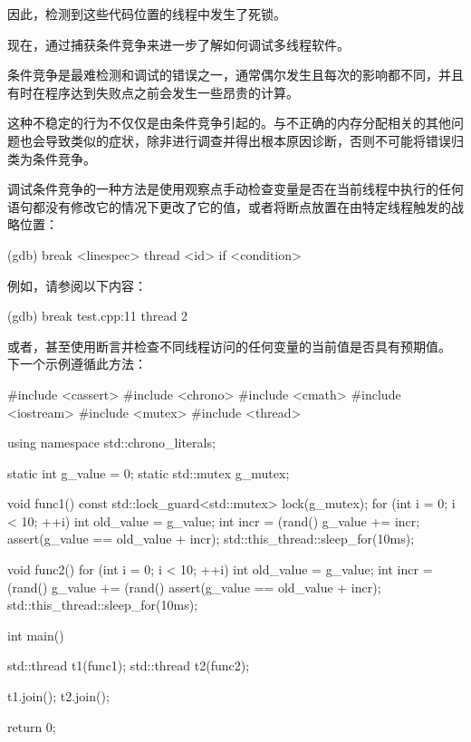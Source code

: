 因此，检测到这些代码位置的线程中发生了死锁。

现在，通过捕获条件竞争来进一步了解如何调试多线程软件。


条件竞争是最难检测和调试的错误之一，通常偶尔发生且每次的影响都不同，并且有时在程序达到失败点之前会发生一些昂贵的计算。

这种不稳定的行为不仅仅是由条件竞争引起的。与不正确的内存分配相关的其他问题也会导致类似的症状，除非进行调查并得出根本原因诊断，否则不可能将错误归类为条件竞争。

调试条件竞争的一种方法是使用观察点手动检查变量是否在当前线程中执行的任何语句都没有修改它的情况下更改了它的值，或者将断点放置在由特定线程触发的战略位置：

\begin{shell}
(gdb) break <linespec> thread <id> if <condition>
\end{shell}

例如，请参阅以下内容：

\begin{shell}
(gdb) break test.cpp:11 thread 2
\end{shell}

或者，甚至使用断言并检查不同线程访问的任何变量的当前值是否具有预期值。 下一个示例遵循此方法：

\begin{cpp}
#include <cassert>
#include <chrono>
#include <cmath>
#include <iostream>
#include <mutex>
#include <thread>

using namespace std::chrono_literals;

static int g_value = 0;
static std::mutex g_mutex;

void func1() {
    const std::lock_guard<std::mutex> lock(g_mutex);
    for (int i = 0; i < 10; ++i) {
        int old_value = g_value;
        int incr = (rand() %
        g_value += incr;
        assert(g_value == old_value + incr);
        std::this_thread::sleep_for(10ms);
    }
}

void func2() {
    for (int i = 0; i < 10; ++i) {
        int old_value = g_value;
        int incr = (rand() %
        g_value += (rand() %
        assert(g_value == old_value + incr);
        std::this_thread::sleep_for(10ms);
    }
}

int main() {
    std::thread t1(func1);
    std::thread t2(func2);

    t1.join();
    t2.join();

    return 0;
}
\end{cpp}

